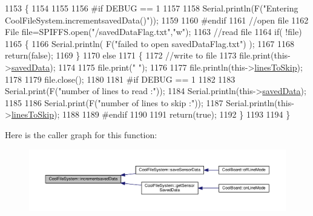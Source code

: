 \begin{DoxyCode}
1153 \{
1154 
1155 
1156 \textcolor{preprocessor}{#if DEBUG == 1}
1157     
1158     Serial.println(F(\textcolor{stringliteral}{"Entering CoolFileSystem.incrementsavedData()"}));  
1159     
1160 \textcolor{preprocessor}{#endif}
1161     \textcolor{comment}{//open file}
1162     File file=SPIFFS.open(\textcolor{stringliteral}{"/savedDataFlag.txt"},\textcolor{stringliteral}{"w"});    
1163     \textcolor{comment}{//read file}
1164     \textcolor{keywordflow}{if}( !file)  
1165     \{
1166         Serial.println( F(\textcolor{stringliteral}{"failed to open savedDataFlag.txt"}) );
1167         
1168         \textcolor{keywordflow}{return}(\textcolor{keyword}{false});      
1169     \}
1170     \textcolor{keywordflow}{else}
1171     \{       
1172         \textcolor{comment}{//write to file }
1173         file.print(this->\hyperlink{class_cool_file_system_ad9f5b739a32100f5f21270c3d9ee2b1d}{savedData});
1174         
1175         file.print(\textcolor{stringliteral}{" "});
1176         
1177         file.println(this->\hyperlink{class_cool_file_system_a84fdb6057e534b395512463daa28ea3c}{linesToSkip});
1178     
1179         file.close();
1180 
1181 \textcolor{preprocessor}{    #if DEBUG == 1}
1182 
1183         Serial.print(F(\textcolor{stringliteral}{"number of lines to read :"}));
1184         Serial.println(this->\hyperlink{class_cool_file_system_ad9f5b739a32100f5f21270c3d9ee2b1d}{savedData});
1185     
1186         Serial.print(F(\textcolor{stringliteral}{"number of lines to skip :"}));
1187         Serial.println(this->\hyperlink{class_cool_file_system_a84fdb6057e534b395512463daa28ea3c}{linesToSkip});
1188 
1189 \textcolor{preprocessor}{    #endif}
1190         
1191         \textcolor{keywordflow}{return}(\textcolor{keyword}{true});
1192     \}
1193     
1194 \}
\end{DoxyCode}
Here is the caller graph for this function\+:\nopagebreak
\begin{figure}[H]
\begin{center}
\leavevmode
\includegraphics[width=350pt]{db/d0c/class_cool_file_system_aae045125288f255f3e258073dcada2a6_icgraph}
\end{center}
\end{figure}
\mbox{\label{class_cool_file_system_ac86a40e7c3a1842f7342f698d34324f9}} 
